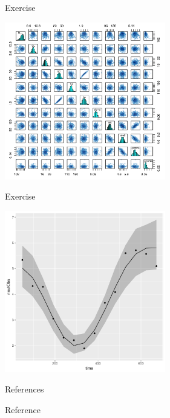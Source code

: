 \documentclass[presentation]{beamer}
\begin{document}
\begin{frame}[label={sec:org4290d3d}]{Exercise}
\begin{latex}
\begin{center}
  \includegraphics[width=7cm]{FKPairs}
\end{center}
\end{latex}
\end{frame}
\begin{frame}[label={sec:org583f921}]{Exercise}
\begin{latex}
\begin{center}
  \includegraphics[width=7cm]{FKModelPlots006.pdf}
\end{center}
\end{latex}
\end{frame}
\begin{frame}[label={sec:org319d805}]{References}
\end{frame}

\begin{frame}[label={sec:orgbf454b4}]{Reference}


\end{frame}
\end{document}
